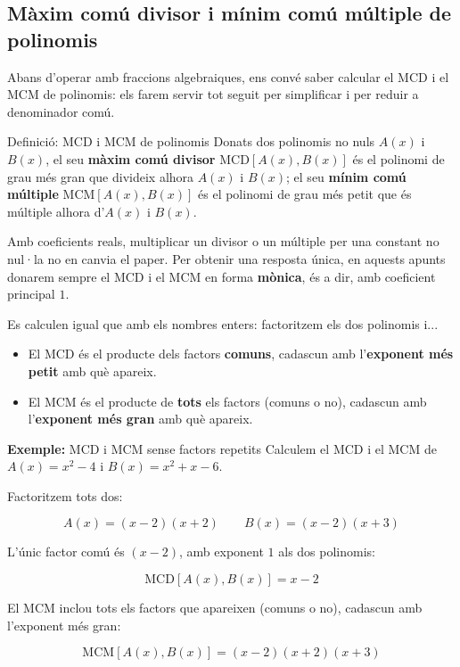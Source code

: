 \subsection{Màxim comú divisor i mínim comú múltiple de polinomis}

Abans d'operar amb fraccions algebraiques, ens convé saber calcular el MCD i el MCM de polinomis: els farem servir tot seguit per simplificar i per reduir a denominador comú.

\begin{definicio}{Definició: MCD i MCM de polinomis}
Donats dos polinomis no nuls $A(x)$ i $B(x)$, el seu \textbf{màxim comú divisor} $\text{MCD}[A(x),B(x)]$ és el polinomi de grau més gran que divideix alhora $A(x)$ i $B(x)$; el seu \textbf{mínim comú múltiple} $\text{MCM}[A(x),B(x)]$ és el polinomi de grau més petit que és múltiple alhora d'$A(x)$ i $B(x)$.

Amb coeficients reals, multiplicar un divisor o un múltiple per una constant no nul·la no en canvia el paper. Per obtenir una resposta única, en aquests apunts donarem sempre el MCD i el MCM en forma \textbf{mònica}, és a dir, amb coeficient principal $1$.

Es calculen igual que amb els nombres enters: factoritzem els dos polinomis i...

\begin{itemize}
\item El MCD és el producte dels factors \textbf{comuns}, cadascun amb l'\textbf{exponent més petit} amb què apareix.
\item El MCM és el producte de \textbf{tots} els factors (comuns o no), cadascun amb l'\textbf{exponent més gran} amb què apareix.
\end{itemize}
\end{definicio}

\begin{exemple}{\textbf{Exemple:} MCD i MCM sense factors repetits}
Calculem el MCD i el MCM de $A(x)=x^2-4$ i $B(x)=x^2+x-6$.

Factoritzem tots dos:

\[
A(x) = (x-2)(x+2) \qquad B(x) = (x-2)(x+3)
\]

L'únic factor comú és $(x-2)$, amb exponent $1$ als dos polinomis:

\[
\text{MCD}[A(x),B(x)] = x-2
\]

El MCM inclou tots els factors que apareixen (comuns o no), cadascun amb l'exponent més gran:

\[
\text{MCM}[A(x),B(x)] = (x-2)(x+2)(x+3)
\]
\end{exemple}

